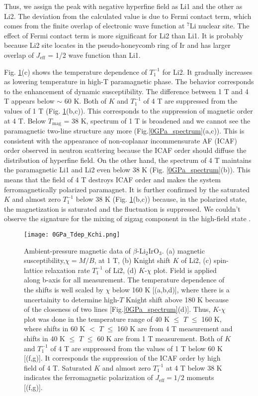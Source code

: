 \documentclass[a4,10.5pt]{report}
\begin{document}
Thus, we assign the peak with negative hyperfine field as Li1 and the other as Li2. 
The deviation from the calculated value is due to Fermi contact term, which comes from the finite overlap of electronic wave function at ${}^7$Li nuclear site. 
The effect of Fermi contact term is more significant for Li2 than Li1. 
It is probably because Li2 site locates in the pseudo-honeycomb ring of Ir and has larger overlap of $J_\mathrm{eff}$ = 1/2 wave function than Li1.

Fig. \ref{0GPa_Tdep_Kchi}(c) shows the temperature dependence of $T^{-1}_1$ for Li2. 
It gradually increases as lowering temperature in high-T paramagnetic phase. 
The behavior corresponds to the enhancement of dynamic susceptibility. 
The difference between 1 T and 4 T appears below $\sim$ 60 K. 
Both of $K$ and $T^{-1}_1$ of 4 T are suppressed from the values of 1 T (Fig. \ref{0GPa_Tdep_Kchi}(b,c)). 
This corresponds to the suppression of magnetic order at 4 T. 
Below $T_{\mathrm{mag}}$ = 38 K, spectrum of 1 T is broadened and we cannot see the paramagnetic two-line structure any more (Fig.\ref{0GPa_spectrum}(a,c)). 
This is consistent with the appearance of non-coplanar incommensurate AF (ICAF) order observed in neutron scattering 
because the ICAF order should diffuse the distribution of hyperfine field. 
On the other hand, the spectrum of 4 T maintains the paramagnetic Li1 and Li2 even below 38 K (Fig. \ref{0GPa_spectrum}(b)). 
This means that the field of 4 T destroys ICAF order and makes the system ferromagnetically polarized paramagnet. 
It is further confirmed by the saturated $K$ and almost zero $T^{-1}_1$ below 38 K (Fig. \ref{0GPa_Tdep_Kchi}(b,c)) 
because, in the polarized state, the magnetization is saturated and the fluctuation is suppressed.
We couldn't observe the signature for the mixing of zigzag component in the high-field state \cite{ruiz2017correlated}.

\begin{figure}
  \centering
  \texttt{[image: 0GPa\_Tdep\_Kchi.png]}
  \caption{Ambient-pressure magnetic data of $\beta$-Li$_2$IrO$_3$.
  (a) magnetic susceptibility,$\chi = M/B$, at 1 T, (b) Knight shift $K$ of Li2, (c) spin-lattice relaxation rate $T^{-1}_1$ of Li2, (d) $K$-$\chi$ plot.
  Field is applied along b-axis for all measurement. 
  The temperature dependence of the shifts is well scaled by $\chi$ below 160 K [(a,b,d)], 
  where there is a uncertainity to determine high-$T$ Knight shift above 180 K because of the closeness of two lines [Fig.\ref{0GPa_spectrum}(d)].
  Thus, $K$-$\chi$ plot was done in the temperature range of 40 K $\leq$ $T$ $\leq$ 160 K, where shifts in 60 K $<$ $T$ $\leq$ 160 K are from 4 T measurement and 
  shifts in 40 K $\leq$ $T$ $\leq$ 60 K are from 1 T measurement.
  Both of $K$ and $T^{-1}_1$ of 4 T are suppressed from the values of 1 T below 60 K [(f,g)].
  It corresponds the suppression of the ICAF order by high field of 4 T.
  Saturated $K$ and almost zero $T^{-1}_1$ at 4 T below 38 K indicates the ferromagnetic polarization of $J_{\mathrm{eff}} = 1/2$ moments [(f,g)].}
  \label{0GPa_Tdep_Kchi}
\end{figure}
\end{document}

